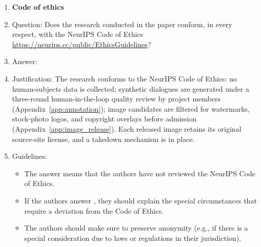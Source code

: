 \documentclass{article}
\begin{document}
\begin{enumerate}
\item {\bf Code of ethics}
    \item[] Question: Does the research conducted in the paper conform, in every respect, with the NeurIPS Code of Ethics \url{https://neurips.cc/public/EthicsGuidelines}?
    \item[] Answer: \answerYes{}
    \item[] Justification: The research conforms to the NeurIPS Code of Ethics: no human-subjects data is collected; synthetic dialogues are generated under a three-round human-in-the-loop quality review by project members (Appendix~\ref{app:annotation}); image candidates are filtered for watermarks, stock-photo logos, and copyright overlays before admission (Appendix~\ref{app:image_release}). Each released image retains its original source-site license, and a takedown mechanism is in place.
    \item[] Guidelines:
    \begin{itemize}
        \item The answer \answerNA{} means that the authors have not reviewed the NeurIPS Code of Ethics.
        \item If the authors answer \answerNo, they should explain the special circumstances that require a deviation from the Code of Ethics.
        \item The authors should make sure to preserve anonymity (e.g., if there is a special consideration due to laws or regulations in their jurisdiction).
    \end{itemize}



\end{enumerate}
\end{document}

